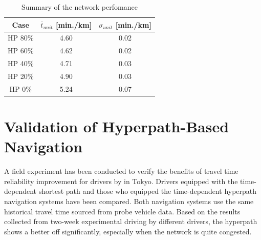 \begin{table}[h]
		\small
		\caption{Summary of the network perfomance}
		\begin{tabular}{ccc}
			\hline
			Case & $\overline{t}_{unit}$ [min./km] & $\sigma_{unit}$ [min./km]\\
			\hline
			HP 80\%& 4.60& 0.02 \\
			HP 60\%& 4.62 & 0.02 \\
			HP 40\%& 4.71 & 0.03 \\
			HP 20\%& 4.90 & 0.03  \\
			HP 0\%& 5.24 & 0.07 \\
			\hline
		\end{tabular}
		\label{tab:tokyo_1}
\end{table}

 
\section{Validation of Hyperpath-Based Navigation}
A field experiment has been conducted to verify the benefits of travel time reliability improvement for drivers by \citet{Ito2015} in Tokyo. Drivers equipped with the time-dependent shortest path and those who equipped the time-dependent hyperpath navigation systems have been compared. Both navigation systems use the same historical travel time sourced from probe vehicle data. Based on the results collected from two-week experimental driving by different drivers, the hyperpath shows a better off significantly, especially when the network is quite congested. 

